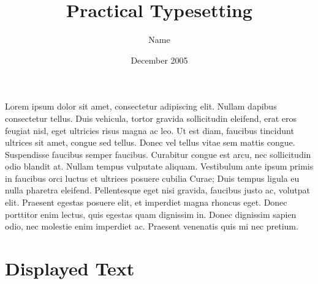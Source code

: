 \documentclass[11pt,a4paper,oneside]{report}
\begin{document}
\title{\color{red}Practical Typesetting}
\author{\color{blue}Name}
\date{\color{green}December 2005}
\maketitle

Lorem ipsum dolor sit amet, consectetur adipiscing elit. Nullam dapibus consectetur tellus. Duis vehicula, tortor
gravida sollicitudin eleifend, erat eros feugiat nisl, eget ultricies risus magna ac leo. Ut est diam, faucibus
tincidunt ultrices sit amet, congue sed tellus. Donec vel tellus vitae sem mattis congue. Suspendisse faucibus
semper faucibus. Curabitur congue est arcu, nec sollicitudin odio blandit at. Nullam tempus vulputate aliquam.
Vestibulum ante ipsum primis in faucibus orci luctus et ultrices posuere cubilia Curae; Duis tempus ligula eu nulla
pharetra eleifend. Pellentesque eget nisi gravida, faucibus justo ac, volutpat elit. Praesent egestas posuere elit,
et imperdiet magna rhoncus eget. Donec porttitor enim lectus, quis egestas quam dignissim in. Donec dignissim sapien
odio, nec molestie enim imperdiet ac. Praesent venenatis quis mi nec pretium.

\section*{Displayed Text}
\end{document}
